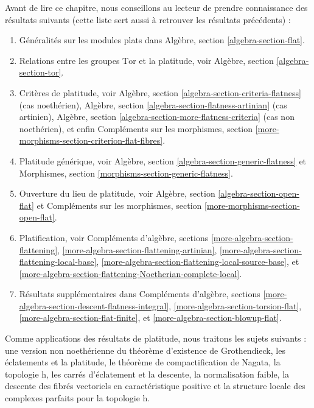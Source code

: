 \medskip\noindent
Avant de lire ce chapitre, nous conseillons au lecteur de prendre connaissance
des résultats suivants (cette liste sert aussi à retrouver
les résultats précédents) :
\begin{enumerate}
\item Généralités sur les modules plats dans
Algèbre, section \ref{algebra-section-flat}.
\item Relations entre les groupes $\text{Tor}$ et la platitude, voir
Algèbre, section \ref{algebra-section-tor}.
\item Critères de platitude, voir
Algèbre, section \ref{algebra-section-criteria-flatness}
(cas noethérien),
Algèbre, section \ref{algebra-section-flatness-artinian}
(cas artinien),
Algèbre, section \ref{algebra-section-more-flatness-criteria}
(cas non noethérien), et enfin
Compléments sur les morphismes, section \ref{more-morphisms-section-criterion-flat-fibres}.
\item Platitude générique, voir
Algèbre, section \ref{algebra-section-generic-flatness}
et
Morphismes, section \ref{morphisms-section-generic-flatness}.
\item Ouverture du lieu de platitude, voir
Algèbre, section \ref{algebra-section-open-flat}
et
Compléments sur les morphismes, section \ref{more-morphisms-section-open-flat}.
\item Platification, voir
Compléments d'algèbre, sections
\ref{more-algebra-section-flattening},
\ref{more-algebra-section-flattening-artinian},
\ref{more-algebra-section-flattening-local-base},
\ref{more-algebra-section-flattening-local-source-base}, et
\ref{more-algebra-section-flattening-Noetherian-complete-local}.
\item Résultats supplémentaires dans
Compléments d'algèbre, sections \ref{more-algebra-section-descent-flatness-integral},
\ref{more-algebra-section-torsion-flat},
\ref{more-algebra-section-flat-finite}, et
\ref{more-algebra-section-blowup-flat}.
\end{enumerate}
Comme applications des résultats de platitude, nous traitons les sujets
suivants : une version non noethérienne du théorème d'existence de Grothendieck,
les éclatements et la platitude, le théorème de compactification de Nagata,
la topologie h, les carrés d'éclatement et la descente, la normalisation faible,
la descente des fibrés vectoriels en caractéristique positive et
la structure locale des complexes parfaits pour la topologie h.






